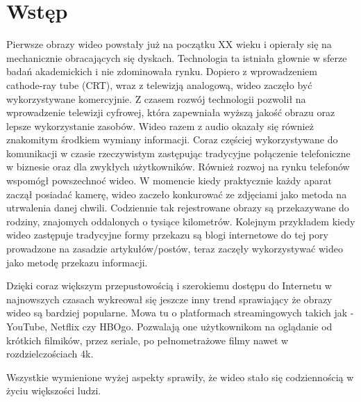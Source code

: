 \chapter{Wstęp}
\label{cha:pierwszyDokument}


Pierwsze obrazy wideo powstały już na początku XX wieku i opierały się na mechanicznie obracających się dyskach. Technologia ta istniała głownie w sferze badań akademickich i nie zdominowała rynku. Dopiero z wprowadzeniem cathode-ray tube (CRT), wraz z telewizją analogową, wideo zaczęło być wykorzystywane komercyjnie.  Z czasem rozwój technologii pozwolił na wprowadzenie telewizji cyfrowej, która zapewniała wyższą jakość obrazu oraz lepsze wykorzystanie zasobów. Wideo razem z audio okazały się również znakomitym środkiem wymiany informacji. Coraz częściej wykorzystywane do komunikacji w czasie rzeczywistym zastępując tradycyjne połączenie telefoniczne w biznesie oraz dla zwykłych użytkowników. Również rozwoj na rynku telefonów wspomógł powszechnoć wideo. W momencie kiedy praktycznie każdy aparat  zaczął posiadać kamerę, wideo zaczeło konkurować ze zdjęciami jako metoda na utrwalenia danej chwili. Codziennie tak rejestrowane obrazy są przekazywane do rodziny, znajomych oddalonych o tysiące kilometrów. Kolejnym przykładem kiedy wideo zastępuje tradycyjne formy przekazu są  blogi internetowe do tej pory prowadzone na zasadzie artykułów/postów, teraz zaczęły wykorzystywać wideo jako metodę  przekazu informacji.

Dzięki coraz większym przepustowością i szerokiemu dostępu do Internetu w najnowszych czasach wykreował się jeszcze inny trend sprawiający że obrazy wideo są bardziej popularne. Mowa tu o platformach streamingowych takich jak - YouTube, Netflix czy HBOgo. Pozwalają one użytkownikom na oglądanie od krótkich filmików, przez seriale, po pełnometrażowe filmy nawet w rozdzielczościach 4k. \par


Wszystkie wymienione wyżej aspekty sprawiły, że wideo stało się codziennością w życiu większości ludzi.\par

